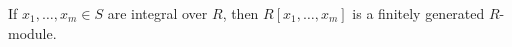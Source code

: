 If $x_1, \ldots, x_m \in S$ are integral over $R$, then $R[x_1, \ldots, x_m]$ is a
finitely generated $R$-module.
